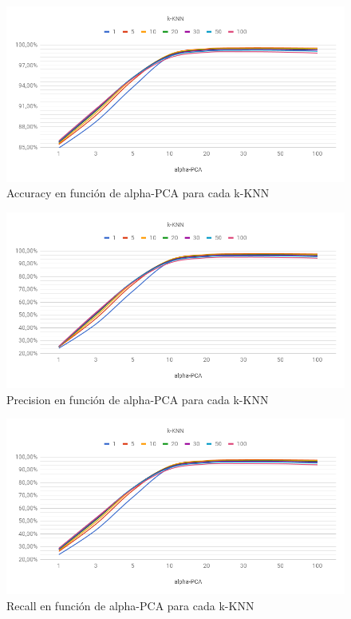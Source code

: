 \begin{figure}[h]
    \centering
    \includegraphics[width=\textwidth]{graficos/cv1_accuracy.png}
    \caption{Accuracy en función de alpha-PCA para cada k-KNN}
    \label{fig:cv1_accuracy}
\end{figure}

\begin{figure}[h]
    \centering
    \includegraphics[width=\textwidth]{graficos/cv1_precision.png}
    \caption{Precision en función de alpha-PCA para cada k-KNN}
    \label{fig:cv1_precision}
\end{figure}

\begin{figure}[h]
    \centering
    \includegraphics[width=\textwidth]{graficos/cv1_recall.png}
    \caption{Recall en función de alpha-PCA para cada k-KNN}
    \label{fig:cv1_recall}
\end{figure}

